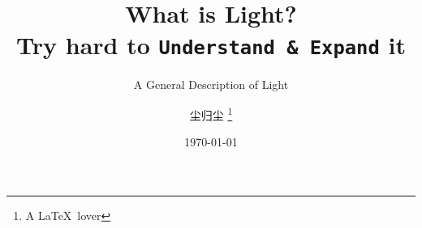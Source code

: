 \documentclass[
	fontsize=10pt, %
	twoside=true, %
	numbers=noenddot, %
]{kaobook}
\begin{document}

\titlehead{\texttt{ETP} Company}
\subject{一场发生在脑海深处的自发极化}

\title[What is Light?]{What is Light? \\ Try hard to {\normalfont\texttt{Understand \&\ Expand}} it}
\subtitle{A General Description of Light}

\author[尘归尘]{尘归尘 \thanks{A \LaTeX\ lover}}

\date{\today}

\publishers{闵可夫斯基\ 出版社}


\frontmatter %




\makeatletter
\uppertitleback{\@titlehead} %
\end{document}
